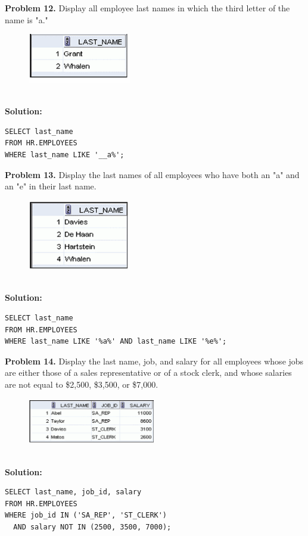 \documentclass[12pt,a4paper]{article}
\begin{document}
\vspace{0.5cm}

\textbf{Problem 12.} Display all employee last names in which the third letter of the name is "a."
\begin{figure}[htbp]
  \centering
  \includegraphics[width=0.4\textwidth]{Screenshots/212.png}
\end{figure}\\
\textbf{Solution:}
\begin{lstlisting}[style=sqlstyle]
SELECT last_name
FROM HR.EMPLOYEES
WHERE last_name LIKE '__a%';
\end{lstlisting}

\vspace{0.5cm}

\textbf{Problem 13.} Display the last names of all employees who have both an "a" and an "e" in their last name.
\begin{figure}[htbp]
  \centering
  \includegraphics[width=0.4\textwidth]{Screenshots/213.png}
\end{figure}\\
\textbf{Solution:}
\begin{lstlisting}[style=sqlstyle]
SELECT last_name
FROM HR.EMPLOYEES
WHERE last_name LIKE '%a%' AND last_name LIKE '%e%';
\end{lstlisting}

\vspace{0.5cm}

\textbf{Problem 14.} Display the last name, job, and salary for all employees whose jobs are either those of a sales representative or of a stock clerk, and whose salaries are not equal to \$2,500, \$3,500, or \$7,000.
\begin{figure}[htbp]
  \centering
  \includegraphics[width=0.5\textwidth]{Screenshots/214.png}
\end{figure}\\
\textbf{Solution:}
\begin{lstlisting}[style=sqlstyle]
SELECT last_name, job_id, salary
FROM HR.EMPLOYEES
WHERE job_id IN ('SA_REP', 'ST_CLERK')
  AND salary NOT IN (2500, 3500, 7000);
\end{lstlisting}
\end{document}
